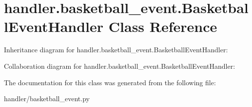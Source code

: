 \hypertarget{classhandler_1_1basketball__event_1_1_basketball_event_handler}{}\section{handler.\+basketball\+\_\+event.\+Basketball\+Event\+Handler Class Reference}
\label{classhandler_1_1basketball__event_1_1_basketball_event_handler}


Inheritance diagram for handler.\+basketball\+\_\+event.\+Basketball\+Event\+Handler\+:


Collaboration diagram for handler.\+basketball\+\_\+event.\+Basketball\+Event\+Handler\+:


The documentation for this class was generated from the following file\+:\begin{DoxyCompactItemize}
\item 
handler/basketball\+\_\+event.\+py\end{DoxyCompactItemize}
